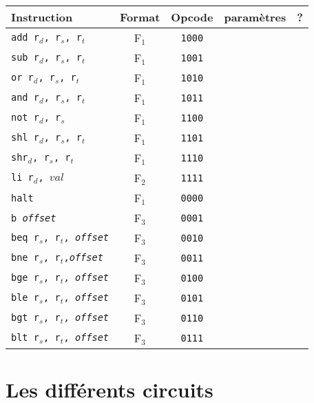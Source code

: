 \documentclass[a4paper]{article}
\begin{document}
			\begin{tabular}{|p{4cm}|c|c|c|c|}
			\hline Instruction & Format & Opcode & paramètres & ? \\ 
			\hline \texttt{add r$_{d}$, r$_{s}$, r$_{t}$} & F$_{1}$ & \texttt{1000} &  &  \\ 
			\hline \texttt{sub r$_{d}$, r$_{s}$, r$_{t}$} & F$_{1}$ & \texttt{1001} &  &  \\ 
			\hline \texttt{or r$_{d}$, r$_{s}$, r$_{t}$} & F$_{1}$ & \texttt{1010} &  &  \\ 
			\hline \texttt{and r$_{d}$, r$_{s}$, r$_{t}$} & F$_{1}$ & \texttt{1011} &  &  \\ 
			\hline \texttt{not r$_{d}$, r$_{s}$} & F$_{1}$ & \texttt{1100} &  &  \\ 
			\hline \texttt{shl r$_{d}$, r$_{s}$, r$_{t}$} & F$_{1}$ & \texttt{1101} &  &  \\ 
			\hline \texttt{shr$_{d}$, r$_{s}$, r$_{t}$} & F$_{1}$ & \texttt{1110} &  &  \\ 
			\hline \texttt{li r$_{d}$, $val$} & F$_{2}$ & \texttt{1111} &  &  \\ 
			\hline \texttt{halt} & F$_{1}$ & \texttt{0000} &  &  \\ 
			\hline \texttt{b \textit{offset}} & F$_{3}$ & \texttt{0001} &  &  \\
			\hline \texttt{beq r$_{s}$, r$_{t}$, \textit{offset}} & F$_{3}$ & \texttt{0010} &  &  \\ 
			\hline \texttt{bne r$_{s}$, r$_{t}$,\textit{offset}} & F$_{3}$ & \texttt{0011} &  &  \\ 
			\hline \texttt{bge r$_{s}$, r$_{t}$, \textit{offset}} & F$_{3}$ & \texttt{0100} &  &  \\ 
			\hline \texttt{ble r$_{s}$, r$_{t}$, \textit{offset}} & F$_{3}$ & \texttt{0101} &  &  \\ 
			\hline \texttt{bgt r$_{s}$, r$_{t}$, \textit{offset}} & F$_{3}$ & \texttt{0110} &  &  \\ 
			\hline \texttt{blt r$_{s}$, r$_{t}$, \textit{offset}} & F$_{3}$ & \texttt{0111} &  &  \\ 

			\hline 
			\end{tabular}
			
			\paragraph{}{}
		
	\section{Les différents circuits}
	
\end{document}
